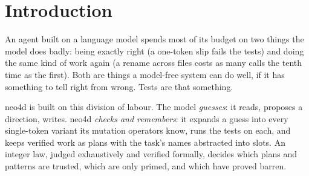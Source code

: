 \documentclass[10pt]{article}
\begin{document}
\begin{abstract}
to explore, neo4d's search fixes 17 hard two-fault bugs where a blind search fixes 14 and a random filter 12.0 on
average, with 60\% fewer test runs. On real bugs at an equal budget over three seeds, a loop in which neo4d mutates
each of the model's attempts fixes 24.7 of 31 with gemma3:4b against 16.0--18.7 for sample-and-filter, self-debugging
and Reflexion ($p \le 0.016$) with about 35\% fewer calls; with phi4-mini it leads (23.0 against 20.0--22.3) without a
significant difference. On two domains that are not code---a numbers puzzle and block-stacking plans---the same core,
unchanged, lifts both small models far above their own methods (Countdown: from 0 to 26--31 of 40), but its search
alone, with no model, does as well or better: there the small models' guesses are worse starts than a neutral one. We
report equally plainly what failed: neo4d's verified programs did not make better training data than sampled ones
(unfiltered, they hurt), evidence handed to a small model as a paragraph made it worse, marks on suspect
lines helped one model and hurt another, and nothing helped on problems a strong model already solves. neo4d adds
power by doing work and remembering it, not by advising.
\end{abstract}

\section{Introduction}

An agent built on a language model spends most of its budget on two things the model does badly: being exactly right
(a one-token slip fails the tests) and doing the same kind of work again (a rename across files costs as many calls
the tenth time as the first). Both are things a model-free system can do well, if it has something to tell right from
wrong. Tests are that something.

neo4d is built on this division of labour. The model \emph{guesses}: it reads, proposes a direction, writes. neo4d
\emph{checks and remembers}: it expands a guess into every single-token variant its mutation operators know, runs the
tests on each, and keeps verified work as plans with the task's names abstracted into slots. An integer law, judged
exhaustively and verified formally, decides which plans and patterns are trusted, which are only primed, and which
have proved barren.
\end{document}
